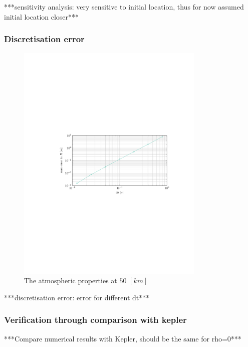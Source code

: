 ***sensitivity analysis: very sensitive to initial location, thus for now assumed initial location closer***\\

\subsubsection{Discretisation error}



\begin{figure}[h]
	\centering
	\includegraphics[trim={4.25cm 10cm 3.2cm 10cm},clip,width=0.8\textwidth]{Figure/orbital_model/dicretization.pdf}
	\caption{The atmospheric properties at $50$ $\left[km\right]$} 
	\label{fig:atmos_disc}
\end{figure}

\label{sec:astrodisc}
***discretisation error: error for different dt***\\

\subsubsection{Verification through comparison with kepler}
\label{sec:astroverf}
***Compare numerical results with Kepler, should be the same for rho=0***\\

